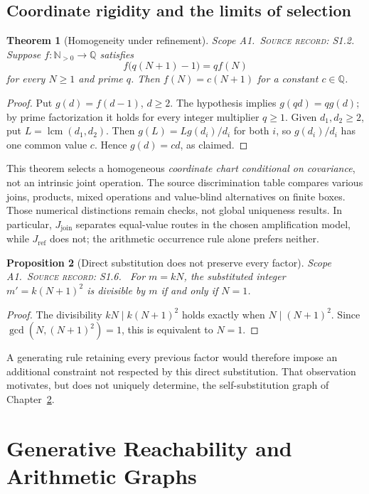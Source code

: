 \documentclass[11pt,oneside,openany]{book}
\newtheorem{theorem}{Theorem}[chapter]
\newtheorem{proposition}[theorem]{Proposition}
\theoremstyle{definition}
\theoremstyle{remark}
\newcommand{\Q}{\mathbb{Q}}
\newcommand{\N}{\mathbb{N}}
\newcommand{\lcmop}{\operatorname{lcm}}
\newcommand{\gcdop}{\operatorname{gcd}}
\newcommand{\scope}[1]{\textsf{\small Scope #1.}\ }
\newcommand{\record}[1]{\textup{\textsc{Source record: #1.}}\ }
\newcommand{\join}{J_{\mathrm{join}}}
\newcommand{\jref}{J_{\mathrm{ref}}}
\begin{document}
\section{Coordinate rigidity and the limits of selection}
\begin{theorem}[Homogeneity under refinement]\label{thm:coordinate}
\scope{A1}\record{S1.2} Suppose \(f:\N_{>0}\to\Q\) satisfies
\[
 f\big(q(N+1)-1\big)=q f(N)
\]
for every \(N\ge1\) and prime \(q\). Then \(f(N)=c(N+1)\) for a constant \(c\in\Q\).
\end{theorem}
\begin{proof}
Put \(g(d)=f(d-1)\), \(d\ge2\). The hypothesis implies \(g(qd)=qg(d)\); by prime factorization it holds for every integer multiplier \(q\ge1\). Given \(d_1,d_2\ge2\), put \(L=\lcmop(d_1,d_2)\). Then \(g(L)=L g(d_i)/d_i\) for both \(i\), so \(g(d_i)/d_i\) has one common value \(c\). Hence \(g(d)=cd\), as claimed.
\end{proof}

This theorem selects a homogeneous \emph{coordinate chart conditional on covariance}, not an intrinsic joint operation. The source discrimination table compares various joins, products, mixed operations and value-blind alternatives on finite boxes. Those numerical distinctions remain checks, not global uniqueness results. In particular, \(\join\) separates equal-value routes in the chosen amplification model, while \(\jref\) does not; the arithmetic occurrence rule alone prefers neither.

\begin{proposition}[Direct substitution does not preserve every factor]\label{prop:factor}
\scope{A1}\record{S1.6} For \(m=kN\), the substituted integer \(m'=k(N+1)^2\) is divisible by \(m\) if and only if \(N=1\).
\end{proposition}
\begin{proof}
The divisibility \(kN\mid k(N+1)^2\) holds exactly when \(N\mid(N+1)^2\). Since \(\gcdop(N,(N+1)^2)=1\), this is equivalent to \(N=1\).
\end{proof}

A generating rule retaining every previous factor would therefore impose an additional constraint not respected by this direct substitution. That observation motivates, but does not uniquely determine, the self-substitution graph of Chapter~\ref{ch:graph}.

\chapter{Generative Reachability and Arithmetic Graphs}\label{ch:graph}
\end{document}
